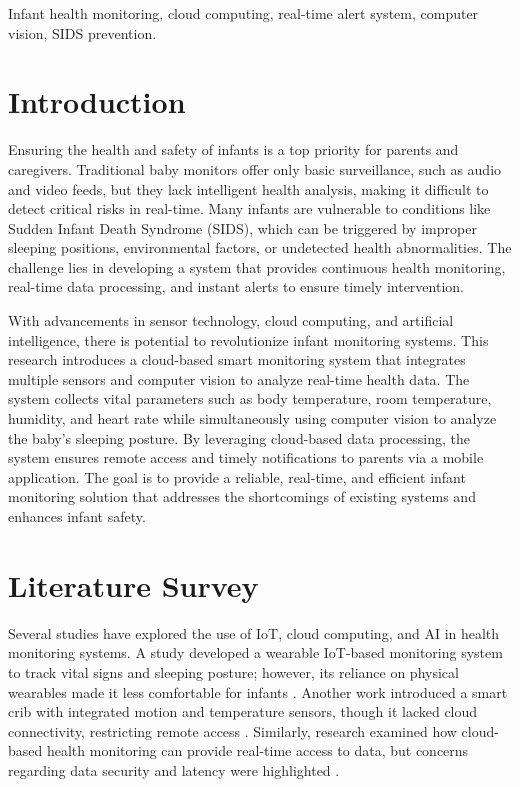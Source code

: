 \documentclass[conference]{IEEEtran}
\begin{document}
    \begin{IEEEkeywords}
    Infant health monitoring, cloud computing, real-time alert system, computer vision, SIDS prevention.
    \end{IEEEkeywords}
    
    \section{Introduction}
    Ensuring the health and safety of infants is a top priority for parents and caregivers. Traditional baby monitors offer only basic surveillance, such as audio and video feeds, but they lack intelligent health analysis, making it difficult to detect critical risks in real-time. Many infants are vulnerable to conditions like Sudden Infant Death Syndrome (SIDS), which can be triggered by improper sleeping positions, environmental factors, or undetected health abnormalities. The challenge lies in developing a system that provides continuous health monitoring, real-time data processing, and instant alerts to ensure timely intervention.

With advancements in sensor technology, cloud computing, and artificial intelligence, there is potential to revolutionize infant monitoring systems. This research introduces a cloud-based smart monitoring system that integrates multiple sensors and computer vision to analyze real-time health data. The system collects vital parameters such as body temperature, room temperature, humidity, and heart rate while simultaneously using computer vision to analyze the baby’s sleeping posture. By leveraging cloud-based data processing, the system ensures remote access and timely notifications to parents via a mobile application. The goal is to provide a reliable, real-time, and efficient infant monitoring solution that addresses the shortcomings of existing systems and enhances infant safety.
\section{Literature Survey}
Several studies have explored the use of IoT, cloud computing, and AI in health monitoring systems. A study developed a wearable IoT-based monitoring system to track vital signs and sleeping posture; however, its reliance on physical wearables made it less comfortable for infants \cite{ref1}. Another work introduced a smart crib with integrated motion and temperature sensors, though it lacked cloud connectivity, restricting remote access \cite{ref2}. Similarly, research examined how cloud-based health monitoring can provide real-time access to data, but concerns regarding data security and latency were highlighted \cite{ref3}.  
\end{document}
